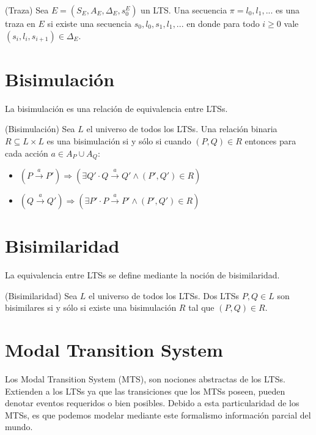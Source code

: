 \begin{definition}{(Traza)}
Sea $E = (S_{E}, A_{E}, \Delta_{E}, s_{0}^{E})$ un LTS. Una secuencia $\pi = l_{0}, l_{1}, ...$ es una traza en $E$ si existe una 
secuencia $s_{0}, l_{0}, s_{1}, l_{1}, ...$ en donde para todo $i \geq 0$ vale $(s_{i}, l_{i}, s_{i + 1}) \in \Delta_{E}$.
\end{definition}

\section{Bisimulación}

La bisimulación es una relación de equivalencia entre LTSs.

\begin{definition}{(Bisimulación)}
Sea $L$ el universo de todos los LTSs. Una relación binaria $R \subseteq L \times L$ es una bisimulación si y sólo si cuando  
$(P, Q) \in R$ entonces para cada acción $a \in A_{P} \cup A_{Q}$:

\begin{itemize}

\item
$(P \xrightarrow{a} P') \Rightarrow (\exists Q' \cdot Q \xrightarrow{a} Q' \land (P', Q') \in R)$

\item
$(Q \xrightarrow{a} Q') \Rightarrow (\exists P' \cdot P \xrightarrow{a} P' \land (P', Q') \in R)$

\end{itemize}

\end{definition}


\section{Bisimilaridad}

La equivalencia entre LTSs se define mediante la noción de bisimilaridad.

\begin{definition}{(Bisimilaridad)}
Sea $L$ el universo de todos los LTSs. Dos LTSs $P, Q \in L$ son bisimilares si y sólo si existe una bisimulación $R$ tal que $(P, Q) \in R$.

\end{definition}

\section{Modal Transition System}
Los Modal Transition System \cite{MTS} (MTS), son nociones abstractas de los LTSs. Extienden a los LTSs ya que las transiciones 
que los MTSs poseen, pueden denotar eventos requeridos o bien posibles. Debido a esta particularidad de los MTSs, es 
que podemos modelar mediante este formalismo información parcial del mundo.

